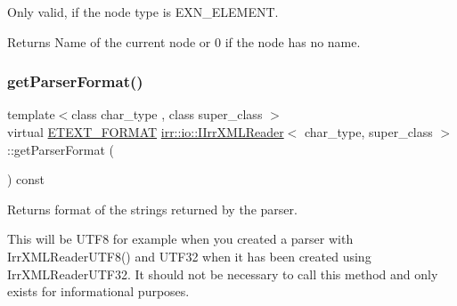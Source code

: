 Only valid, if the node type is E\+X\+N\+\_\+\+E\+L\+E\+M\+E\+NT. \begin{DoxyReturn}{Returns}
Name of the current node or 0 if the node has no name. 
\end{DoxyReturn}
\mbox{\label{classirr_1_1io_1_1IIrrXMLReader_a9af7e323c292a4836bf4a7c093b4d85a}} 
\subsubsection{\texorpdfstring{get\+Parser\+Format()}{getParserFormat()}\hspace{0.1cm}{\footnotesize\ttfamily [1/2]}}
{\footnotesize\ttfamily template$<$class char\+\_\+type , class super\+\_\+class $>$ \\
virtual \hyperlink{namespaceirr_1_1io_ac7e51e5a6bd00451dec248f497b16a9d}{E\+T\+E\+X\+T\+\_\+\+F\+O\+R\+M\+AT} \hyperlink{classirr_1_1io_1_1IIrrXMLReader}{irr\+::io\+::\+I\+Irr\+X\+M\+L\+Reader}$<$ char\+\_\+type, super\+\_\+class $>$\+::get\+Parser\+Format (\begin{DoxyParamCaption}{ }\end{DoxyParamCaption}) const\hspace{0.3cm}{\ttfamily [pure virtual]}}



Returns format of the strings returned by the parser. 

This will be U\+T\+F8 for example when you created a parser with Irr\+X\+M\+L\+Reader\+U\+T\+F8() and U\+T\+F32 when it has been created using Irr\+X\+M\+L\+Reader\+U\+T\+F32. It should not be necessary to call this method and only exists for informational purposes. \mbox{\label{classirr_1_1io_1_1IIrrXMLReader_a9af7e323c292a4836bf4a7c093b4d85a}} 
